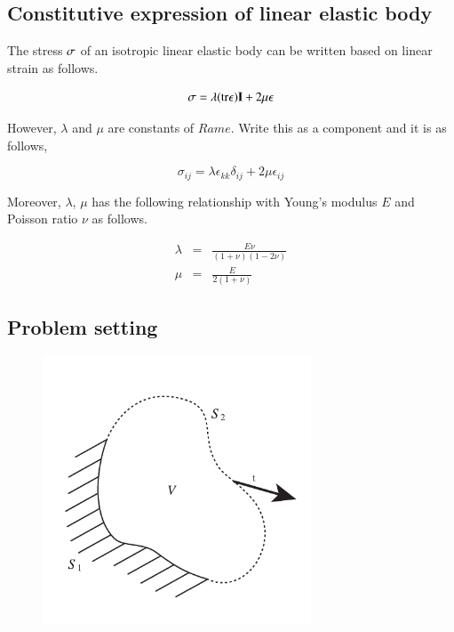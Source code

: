 \subsection{Constitutive expression of linear elastic body}


The stress $\mathbf{\sigma}$ of an isotropic linear elastic body can be written based on linear strain as follows.

\begin{equation}
\mathbf{\sigma}=\lambda({\rm tr}\mathbf{\epsilon})\mathbf{I}+2\mu\mathbf{\epsilon}
\end{equation}


However, $\lambda$ and $\mu$ are constants of $Rame$.
Write this as a component and it is as follows,

\begin{equation}
\sigma_{ij}=\lambda\epsilon_{kk}\delta_{ij}+2\mu\epsilon_{ij}
\end{equation}


Moreover, $\lambda$, $\mu$ has the following relationship with Young's modulus $E$ and Poisson ratio $\nu$ as follows.

\begin{eqnarray}
\lambda &=& \frac{E\nu}{(1+\nu)(1-2\nu)}\\
\mu &=& \frac{E}{2(1+\nu)}
\end{eqnarray}


\subsection{Problem setting}


\begin{figure}[hpbt]
\center
\includegraphics[width=80mm]{images/solid_domain}
\end{figure}

